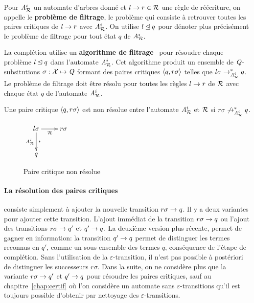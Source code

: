 \begin{definition}
  Pour ${\mathit A}_{\mathcal R}^i$ un automate d'arbres donné et $l \rightarrow r \in \mathcal R$ une
  règle de réécriture, on appelle le \textbf{problème de filtrage}, le
  problème qui consiste à retrouver toutes les paires critiques de $l
  \rightarrow r$ avec ${\mathit A}_{\mathcal R}^i$. On utilise $l \unlhd q$ pour dénoter plus précisément
  le problème de filtrage pour tout état $q$ de ${\mathit A}_{\mathcal R}^i$.
\end{definition}

La complétion utilise un \textbf{algorithme de filtrage}~\cite{FeuilladeGVTT-JAR04}
pour résoudre chaque problème $l \unlhd q$ dans l'automate ${\mathit A}_{\mathcal R}^i$. 
Cet algorithme produit un ensemble de $\mathit Q$-subsitutions $\sigma: \mathcal X \mapsto \mathit Q$
formant des paires critiques $\langle q, r\sigma\rangle$ telles que $l\sigma \rightarrow_{{\mathit A}_{\mathcal R}^i}^* q$.
Le problème de filtrage doit être résolu pour toutes les règles $l\rightarrow r$ de $\mathcal R$ avec
chaque état $q$ de l'automate ${\mathit A}_{\mathcal R}^i$.

\begin{definition}
  Une paire critique $\langle q, r\sigma\rangle$ est non résolue entre l'automate ${\mathit A}_{\mathcal R}^i$ et $\mathcal R$ si $r\sigma \not\rightarrow_{{\mathit A}_{\mathcal R}^i}^* q$.
  \begin{figure}[ht!]
    \centering
    $
    \xymatrix{
      l\sigma \ar[r]_{\R}\ar[d]^{*}_{\aaex^i} & r\sigma \\%
      q & %
    }
    $
    \caption{\footnotesize Paire critique non résolue\label{fig:cp}}
  \end{figure}  
\end{definition}

\paragraph{La résolution des paires critiques} consiste simplement à ajouter la nouvelle transition $r\sigma \rightarrow q$.
Il y a deux variantes pour ajouter cette transition. L'ajout immédiat de la transition $r\sigma \rightarrow q$
ou l'ajout des transitions $r\sigma \rightarrow q'$ et $q' \rightarrow q$. La deuxième version plus récente, permet de 
gagner en information: la transition $q' \rightarrow q$ permet de distinguer les termes reconnus en $q'$, comme 
un sous-ensemble des termes $q$, conséquence de l'étape de complétion. Sans l'utilisation de la $\varepsilon$-transition,
il n'est pas possible à postériori de distinguer les successeurs $r\sigma$. 
Dans la suite, on ne considère plus que la variante $r\sigma \rightarrow q'$ et $q' \rightarrow q$ pour résoudre les paires critiques,
sauf au chapitre~\ref{chap:certif} où l'on considère un automate  sans $\varepsilon$-transitions
qu'il est toujours possible d'obtenir par nettoyage des $\varepsilon$-transitions.


